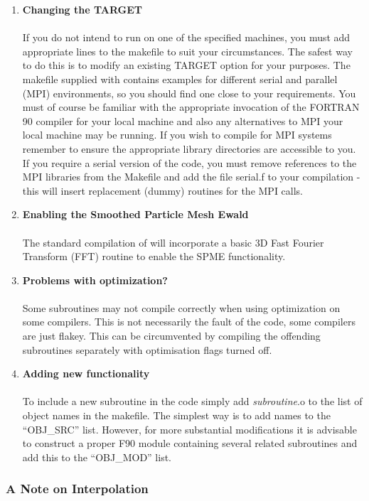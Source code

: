 \begin{enumerate}
\item {\bf Changing the TARGET}\\~\\
If you do not intend to run \D{} on one of the specified machines, you
must add appropriate lines to the makefile to suit your
circumstances. The safest way to do this is to modify an existing
TARGET option for your purposes. The makefile supplied with \D{}
contains examples for different serial and parallel (MPI) 
environments, so you should find one close to your
requirements.  You must of course be familiar with the appropriate
invocation of the FORTRAN 90 compiler for your local machine and also any
alternatives to MPI your local machine may be running.  If you wish to
compile for MPI systems remember to ensure the appropriate library
directories are accessible to you. If you require a serial version of
the code, you must remove references to the MPI libraries from the
Makefile and add the file serial.f to your compilation - this will
insert replacement (dummy) routines for the MPI calls.


\item {\bf Enabling the Smoothed Particle Mesh Ewald}\\~\\
The standard compilation of \D{} will incorporate a basic 3D Fast
Fourier Transform (FFT) routine to enable the SPME functionality.

\item {\bf Problems with optimization?}\\~\\
Some subroutines may not compile correctly when using optimization on
some compilers. This is not necessarily the fault of the \D{} code, some
compilers are just flakey. This can be circumvented by compiling the offending
subroutines separately with optimisation flags turned off.
\item {\bf Adding new functionality} \\~\\ To include a new subroutine in the
code simply add {\em subroutine}.o to the list of object names in the
makefile. The simplest way is to add names to the ``OBJ\_SRC'' list. However,
for more substantial modifications it is advisable to construct a proper F90
module containing several related subroutines and add this to the ``OBJ\_MOD''
list.
\end{enumerate}

\subsubsection{A Note on Interpolation}
\label{interpol}

